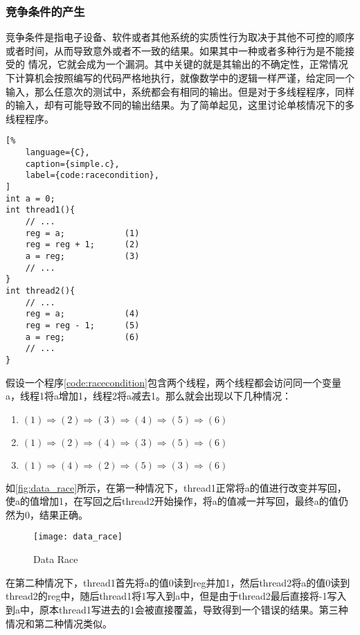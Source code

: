 \subsubsection{竞争条件的产生}

竞争条件是指电子设备、软件或者其他系统的实质性行为取决于其他不可控的顺序或者时间，从而导致意外或者不一致的结果。如果其中一种或者多种行为是不能接受的 情况，它就会成为一个漏洞。其中关键的就是其输出的不确定性，正常情况下计算机会按照编写的代码严格地执行，就像数学中的逻辑一样严谨，给定同一个输入，那么任意次的测试中，系统都会有相同的输出。但是对于多线程程序，同样的输入，却有可能导致不同的输出结果。为了简单起见，这里讨论单核情况下的多线程程序。

\begin{spacing}{1.0}
\begin{lstlisting}[%
    language={C},
    caption={simple.c},
    label={code:racecondition},
]
int a = 0;
int thread1(){
    // ...
    reg = a;            (1)
    reg = reg + 1;      (2)
    a = reg;            (3)
    // ...
}
int thread2(){
    // ...
    reg = a;            (4)
    reg = reg - 1;      (5)
    a = reg;            (6)
    // ...
}
\end{lstlisting}
\end{spacing}

假设一个程序\autoref{code:racecondition}包含两个线程，两个线程都会访问同一个变量a，线程1将a增加1，线程2将a减去1。那么就会出现以下几种情况：

\begin{enumerate}
\item $(1) \Rightarrow (2) \Rightarrow (3) \Rightarrow (4) \Rightarrow (5) \Rightarrow (6)$
\item $(1) \Rightarrow (2) \Rightarrow (4) \Rightarrow (3) \Rightarrow (5) \Rightarrow (6)$
\item $(1) \Rightarrow (4) \Rightarrow (2) \Rightarrow (5) \Rightarrow (3) \Rightarrow (6)$
\end{enumerate}

如\autoref{fig:data_race}所示，在第一种情况下，thread1正常将a的值进行改变并写回，使a的值增加1，在写回之后thread2开始操作，将a的值减一并写回，最终a的值仍然为0，结果正确。

\begin{figure}[ht]
    \centering
    \texttt{[image: data\_race]}
    \caption{\label{fig:data_race}Data Race}
\end{figure}


在第二种情况下，thread1首先将a的值0读到reg并加1，然后thread2将a的值0读到thread2的reg中，随后thread1将1写入到a中，但是由于thread2最后直接将-1写入到a中，原本thread1写进去的1会被直接覆盖，导致得到一个错误的结果。第三种情况和第二种情况类似。

